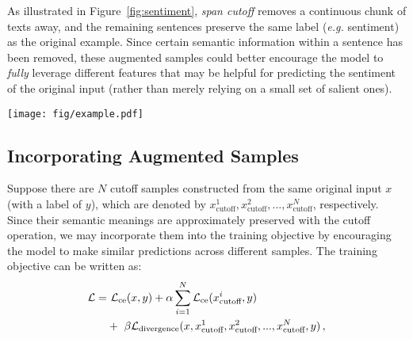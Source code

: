 \documentclass[11pt,a4paper]{article}
\begin{document}
As illustrated in Figure~\ref{fig:sentiment}, \emph{span cutoff} removes a continuous chunk of texts away, and the remaining sentences preserve the same label (\emph{e.g.} sentiment) as the original example. 
Since certain semantic information within a sentence has been removed, these augmented samples could better encourage the model to \emph{fully} leverage different features that may be helpful for predicting the sentiment of the original input (rather than merely relying on a small set of salient ones).
\begin{figure*}
	\centering
	\texttt{[image: fig/example.pdf]} 
	\vspace{-6mm}
	\caption{Illustration of the proposed span cutoff method with one specific example (from the SST-2 dataset). In this case, the model is supposed to produce consistent predictions (\emph{i.e.}, sentiments) for all three augmented samples (with various spans of tokens removed).}
	\label{fig:sentiment}
	\vspace{-4mm}
\end{figure*}


\vspace{-1mm}
\subsection{Incorporating Augmented Samples}
Suppose there are $N$ cutoff samples constructed from the same original input $x$ (with a label of $y$), which are denoted by $x_{\text{cutoff}}^{1}, x_{\text{cutoff}}^{2}, ... ,x_{\text{cutoff}}^{N}$, respectively. Since their semantic meanings are approximately preserved with the cutoff operation, we may incorporate them into the training objective by encouraging the model to make similar predictions across different samples. The training objective can be written as:
\begin{align}
\mathcal{L}= & \ {\mathcal{L}_{\rm ce}(x, y)} +  \alpha \sum_{i=1}^{N} {\mathcal{L}_{\rm ce}(x_{\text{cutoff}}^{i}, y)} \nonumber \\
& +\ \beta\mathcal{L}_{\rm divergence}(x, x_\text{cutoff}^{1}, x_\text{cutoff}^{2}, ..., x_\text{cutoff}^{N}, y) \,,  \label{eq:loss}
\end{align}
\end{document}
